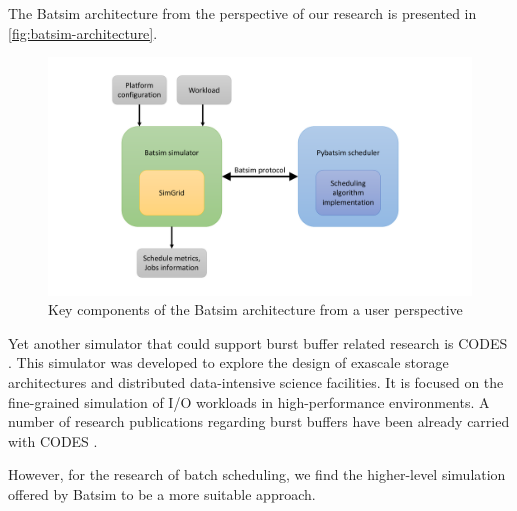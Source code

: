 \documentclass[thesis-en.tex]{subfiles}
\begin{document}
The Batsim architecture from the perspective of our research is presented in \autoref{fig:batsim-architecture}.
\begin{figure}[ht]
    \centering
    \includegraphics[width=\textwidth]{images/Batsim-architecture.pdf}
    \caption{Key components of the Batsim architecture from a user perspective}
    \label{fig:batsim-architecture}
\end{figure}

%     

\bigskip

Yet another simulator that could support burst buffer related research is CODES \cite{codes,Cope2011CODESEC,osti_1311761}. This simulator was developed to explore the design of exascale storage architectures and distributed data-intensive science facilities. It is focused on the fine-grained simulation of I/O workloads in high-performance environments. A number of research publications regarding burst buffers have been already carried with CODES \cite{6232369,10.1145/2832087.2832091,8048932}.

However, for the research of batch scheduling, we find the higher-level simulation offered by Batsim to be a more suitable approach.
\end{document}
